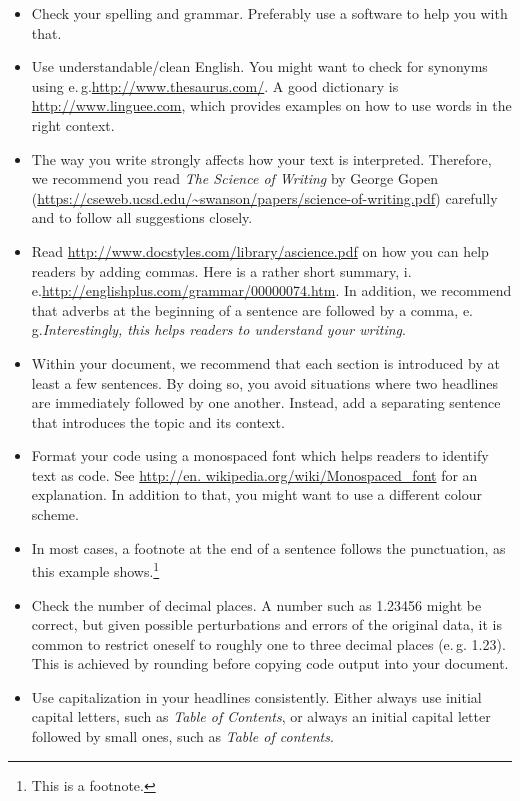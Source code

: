 \documentclass{thesisclass}
\newcommand\ie{i.\,e.\xspace}
\newcommand\eg{e.\,g.\xspace}
\begin{document}
\begin{itemize}
	\item Check your spelling and grammar. Preferably use a software to help you with that.
	\item Use understandable/clean English. You might want to check for synonyms using \eg \url{http://www.thesaurus.com/}. A good dictionary is \url{http://www.linguee.com}, which provides examples on how to use words in the right context.
	\item The way you write strongly affects how your text is interpreted. Therefore, we recommend you read \emph{The Science of Writing} by George Gopen (\url{https://cseweb.ucsd.edu/~swanson/papers/science-of-writing.pdf}) carefully and to follow all suggestions closely.
	\item Read \url{http://www.docstyles.com/library/ascience.pdf} on how you can help readers by adding commas. Here is a rather short summary, \ie \url{http://englishplus.com/grammar/00000074.htm}. In addition, we recommend that adverbs at the beginning of a sentence are followed by a comma, \eg \emph{Interestingly, this helps
readers to understand your writing}.
   \item Within your document, we recommend that each section is introduced by at least a few sentences. By doing so, you avoid situations where two headlines are immediately followed by one another. Instead, add a separating sentence that introduces the topic and its context.
   \item Format your code using a monospaced font which helps readers to identify text as code. See \url{http://en. wikipedia.org/wiki/Monospaced_font} for an explanation. In addition to that, you might want to use a different colour scheme.
	\item In most cases, a footnote at the end of a sentence follows the punctuation, as this example shows.\footnote{This is a footnote.}
	\item Check the number of decimal places. A number such as 1.23456 might be correct, but given possible perturbations and errors of the original data, it is common to restrict oneself to roughly one to three decimal places (\eg 1.23). This is achieved by rounding before copying code output into your document.
	\item Use capitalization in your headlines consistently. Either always use initial capital letters, such as \emph{Table of Contents}, or always an initial capital letter followed by small ones, such as \emph{Table of contents}.
\end{itemize}
\end{document}
